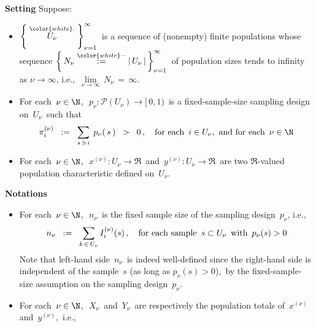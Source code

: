 \vskip 0.5cm
\begin{theorem}
\mbox{}
\vskip 0.05cm
\noindent
\textbf{Setting}
\vskip 0.1cm
\noindent
Suppose:
\begin{itemize}
\item
    $\left\{\;\overset{{\color{white}.}}{U_{\nu}}\;\right\}_{\nu=1}^{\infty}$\,
    is a sequence of (nonempty) finite populations whose sequence
    $\left\{\,N_{\nu} \overset{{\color{white}-}}{:=} \vert\,U_{\nu}\,\vert\,\right\}_{\nu=1}^{\infty}$\,
    of population sizes tends to infinity as $\nu \rightarrow \infty$, i.e.,
    \,$\underset{\nu\rightarrow\infty}{\lim}\,N_{\nu} \,=\, \infty$.\,
\item
    For each \,$\nu \in \N$,\,
    \,$p_{\nu} : \mathcal{P}(U_{\nu}) \longrightarrow [\,0,1)$\,
    is a {\color{red}fixed-sample-size} sampling design on \,$U_{\nu}$\,
    such that
    \begin{equation*}
    \pi^{(\nu)}_{i}
    \;\; := \;\;
        \underset{s\,\ni\,i}{\sum}\;\,
        p_{\nu}\!\left(\,s\,\right)
    \;\; > \;\;
        0\,,
    \quad
    \textnormal{for each \,$i \in U_{\nu}$,\, and for each \,$\nu\in\N$}
    \end{equation*}
\item
    For each \,$\nu \in \N$,\,
    \,$x^{(\nu)} : U_{\nu} \longrightarrow \Re$\,
    and
    \,$y^{(\nu)} : U_{\nu} \longrightarrow \Re$\,
    are two $\Re$-valued population characteristic defined on \,$U_{\nu}$.\,
\end{itemize}
\vskip 0.2cm
\noindent
\textbf{Notations}
\begin{itemize}
\item
    For each \,$\nu\in\N$,\,
    \,$n_{\nu}$\, is the fixed sample size of the sampling design \,$p_{\nu}$, i.e.,\,
    \begin{equation*}
    n_{\nu}
    \;\; := \;\;
        \underset{k\,\in\,U_{\nu}}{\sum}\,I^{(\nu)}_{i}(s)\,,
    \quad
    \textnormal{for each sample \,$s \subset U_{\nu}$\, with \,$p_{\nu}(s) > 0$}
    \end{equation*}
    Note that left-hand side \,$n_{\nu}$\, is indeed well-defined
    since the right-hand side is independent of the sample \,$s$ (as long as $p_{\nu}(s) > 0$),\,
    by the fixed-sample-size assumption on the sampling design \,$p_{\nu}$.
\item
    For each \,$\nu\in\N$,\,
    \,$X_{\nu}$\, and \,$Y_{\nu}$\,
    are respectively the population totals of
    \,$x^{(\nu)}$\, and \,$y^{(\nu)}$,\, i.e.,
    \begin{equation*}

\end{equation*}
\end{itemize}
\end{theorem}
